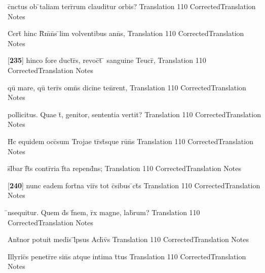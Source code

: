 \documentclass[]{book}
\begin{document}
\latline
  {c\={}nctus ob \={}taliam terr\={}rum clauditur orbis?}
  { Translation }
  {110}
  { CorrectedTranslation }
  { Notes }


\latline
  {Cert\={} hinc R\={}m\={}n\={}s \={}lim volventibus ann\={\macron {\i}}s,}
  { Translation }
  {110}
  { CorrectedTranslation }
  { Notes }


\latline
  {[\textbf{235}] hinco fore duct\={}r\={}s, revoc\={}t\={} \={} sanguine Teucr\={\macron {\i}},}
  { Translation }
  {110}
  { CorrectedTranslation }
  { Notes }


\latline
  {qu\={\macron {\i}} mare, qu\={\macron {\i}} terr\={}s omn\={\macron {\i}}s dici\={}ne ten\={}rent,}
  { Translation }
  {110}
  { CorrectedTranslation }
  { Notes }


\latline
  {pollicitus.  Quae t\={}, genitor, sententia vertit?}
  { Translation }
  {110}
  { CorrectedTranslation }
  { Notes }


\latline
  {H\={}c equidem occ\={}sum Trojae tr\={\macron {\i}}st\={\macron {\i}}sque ru\={\macron {\i}}n\={}s}
  { Translation }
  {110}
  { CorrectedTranslation }
  { Notes }


\latline
  {s\={}l\={}bar f\={}t\={\macron {\i}}s contr\={}ria f\={}ta repend\={}ns;}
  { Translation }
  {110}
  { CorrectedTranslation }
  { Notes }


\latline
  {[\textbf{240}] nunc eadem fort\={}na vir\={}s tot c\={}sibus \={}ct\={}s}
  { Translation }
  {110}
  { CorrectedTranslation }
  { Notes }


\latline
  {\={\macron {\i}}nsequitur.  Quem d\={}s f\={\macron {\i}}nem, r\={}x magne, lab\={}rum?}
  { Translation }
  {110}
  { CorrectedTranslation }
  { Notes }


\latline
  {Ant\={}nor potuit medi\={\macron {\i}}s \={}l\={}psus Ach\={\macron {\i}}v\={\macron {\i}}s}
  { Translation }
  {110}
  { CorrectedTranslation }
  { Notes }


\latline
  {Illyric\={}s penetr\={}re sin\={}s atque intima t\={}tus}
  { Translation }
  {110}
  { CorrectedTranslation }
  { Notes }
\end{document}
